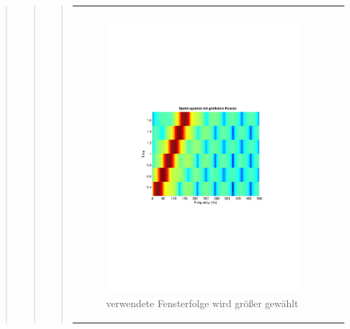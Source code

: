 \begin{quote}
\begin{quote}
\begin{quote}
\begin{center}
\begin{tabular}{ll}
\begin{minipage}{0.6\textwidth}
                        \begin{figure}[H]
                            \label{fig:}
                            \includegraphics[scale=0.63, trim = 3cm 9cm 3cm
                            9cm,
                            clip]{./Bilder/bsp_chirp_spectrogram_grossesFenster}
                            \caption{verwendete Fensterfolge wird größer
                            gewählt}
                        \end{figure}
                    \vspace{-1.5em}
    
                    \end{minipage}
    
                \end{tabular}
                \end{center}
                

\end{quote}
\end{quote}
\end{quote}

